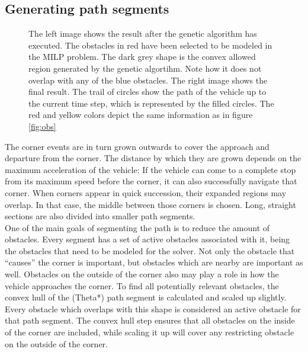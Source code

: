 \subsection{Generating path segments}
\begin{figure}[!t]
    \centering
    \hfil
    \caption{The left image shows the result after the genetic algorithm has executed. The obstacles in red have been selected to be modeled in the MILP problem. The dark grey shape is the convex allowed region generated by the genetic algortihm. Note how it does not overlap with any of the blue obstacles. The right image shows the final result. The trail of circles show the path of the vehicle up to the current time step, which is represented by the filled circles. The red and yellow colors depict the same information as in figure \ref{fig:obs}}\label{fig:pre-3-4}
\end{figure}
The corner events are in turn grown outwards to cover the approach and departure from the corner. The distance by which they are grown depends on the maximum acceleration of the vehicle: If the vehicle can come to a complete stop from its maximum speed before the corner, it can also successfully navigate that corner. When corners appear in quick succession, their expanded regions may overlap. In that case, the middle between those corners is chosen. Long, straight sections are also divided into smaller path segments.\\
One of the main goals of segmenting the path is to reduce the amount of obstacles. Every segment has a set of active obstacles associated with it, being the obstacles that need to be modeled for the solver. Not only the obstacle that ``causes'' the corner is important, but obstacles which are nearby are important as well. Obstacles on the outside of the corner also may play a role in how the vehicle approaches the corner. To find all potentially relevant obstacles, the convex hull of the (Theta*) path segment is calculated and scaled up slightly. Every obstacle which overlaps with this shape is considered an active obstacle for that path segment. The convex hull step ensures that all obstacles on the inside of the corner are included, while scaling it up will cover any restricting obstacle on the outside of the corner.

